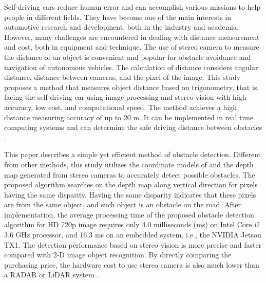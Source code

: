 Self-driving cars reduce human error and can accomplish various missions to help people in different fields. They have become one of the main interests in automotive research and development, both in the industry and academia. However, many challenges are encountered in dealing with distance measurement and cost, both in equipment and technique. The use of stereo camera to measure the distance of an object is convenient and popular for obstacle avoidance and navigation of autonomous vehicles. The calculation of distance considers angular distance, distance between cameras, and the pixel of the image. This study proposes a method that measures object distance based on trigonometry, that is, facing the self-driving car using image processing and stereo vision with high accuracy, low cost, and computational speed. The method achieves a high distance measuring accuracy of up to 20 m. It can be implemented in real time computing systems and can determine the safe driving distance between obstacles \cite{Salman2017}.

This paper describes a simple yet efficient method of obstacle detection. Different from other methods, this study utilizes the coordinate models of and the depth map generated from stereo cameras to accurately detect possible obstacles. The proposed algorithm searches on the depth map along vertical direction for pixels having the same disparity. Having the same disparity indicates that these pixels are from the same object, and such object is an obstacle on the road. After implementation, the average processing time of the proposed obstacle detection algorithm for HD 720p image requires only 4.0 milliseconds (ms) on Intel Core i7 3.6 GHz processor, and 16.3 ms on an embedded system, i.e., the NVIDIA Jetson TX1. The detection performance based on stereo vision is more precise and faster compared with 2-D image object recognition. By directly comparing the purchasing price, the hardware cost to use stereo camera is also much lower than a RADAR or LiDAR system \cite{Tsai2018}.

